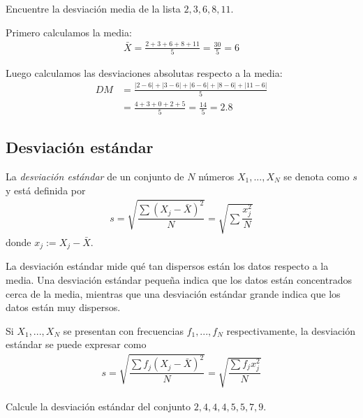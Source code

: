\begin{ejemplo}
	Encuentre la desviación media de la lista $2,3,6,8,11.$
\end{ejemplo}

\begin{solucion}
	Primero calculamos la media:
	\begin{align}
		\bar{X} = \frac{2+3+6+8+11}{5} = \frac{30}{5} = 6
	\end{align}
	
	Luego calculamos las desviaciones absolutas respecto a la media:
	\begin{align}
		DM &= \frac{|2-6| + |3-6| + |6-6| + |8-6| + |11-6|}{5} \\
		&= \frac{4 + 3 + 0 + 2 + 5}{5} = \frac{14}{5} = 2.8
	\end{align}
\end{solucion}


\subsection{Desviación estándar}
La \emph{desviación estándar} de un conjunto de $N$ números $X_{1},...,X_{N}$ se denota como $s$ y está definida por
\begin{align}
	s=\sqrt{\dfrac{\sum\left( X_{j}-\bar{X} \right)^{2}}{N}}=\sqrt{\sum\dfrac{x_{j}^{2}}{N}}
\end{align} donde $x_{j}:=X_{j}-\bar{X}.$

\begin{observacion}
	La desviación estándar mide qué tan dispersos están los datos respecto a la media. Una desviación estándar pequeña indica que los datos están concentrados cerca de la media, mientras que una desviación estándar grande indica que los datos están muy dispersos.
\end{observacion}

Si $X_{1},...,X_{N}$ se presentan con frecuencias $f_{1},...,f_{N}$ respectivamente, la desviación estándar se puede expresar como
\begin{align}
	s=\sqrt{\dfrac{\sum f_{j}\left( X_{j}-\bar{X} \right)^{2}}{N}}=\sqrt{\dfrac{\sum f_{j}x_{j}^{2}}{N}}
\end{align}

\begin{ejemplo}
	Calcule la desviación estándar del conjunto $2, 4, 4, 4, 5, 5, 7, 9.$
\end{ejemplo}

